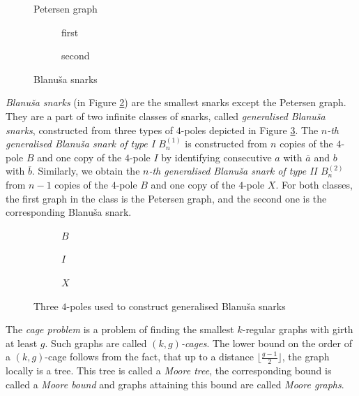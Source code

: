 \begin{minipage}{.3\textwidth}
\begin{figure}[H]
\centering

\caption{Petersen graph}
\label{fig:petersen}
\end{figure}
\end{minipage}%
%
\begin{minipage}{.7\textwidth}
\begin{figure}[H]
\centering
\begin{subfigure}{0.4\textwidth}
\centering

\caption{first}
\end{subfigure}
\begin{subfigure}{0.4\textwidth}
\centering

\caption{second}
\end{subfigure}
\caption{Blanuša snarks}
\label{fig:blanusa}
\end{figure}
\end{minipage}

\emph{Blanuša snarks} (in Figure \ref{fig:blanusa}) are the smallest snarks except the Petersen graph. They are a part of two infinite classes of snarks, called \emph{generalised Blanuša snarks}, constructed from three types of $4$-poles depicted in Figure \ref{fig:networks}. The \emph{$n$-th generalised Blanuša snark of type I $B_n^{(1)}$} is constructed from $n$ copies of the $4$-pole $B$ and one copy of the $4$-pole $I$ by identifying consecutive $a$ with $\overline{a}$ and $b$ with $\overline{b}$. Similarly, we obtain the \emph{$n$-th generalised Blanuša snark of type II $B_n^{(2)}$} from $n-1$ copies of the $4$-pole $B$ and one copy of the $4$-pole $X$. For both classes, the first graph in the class is the Petersen graph, and the second one is the corresponding Blanuša snark.

\begin{figure}[h!]
\centering
\begin{subfigure}{0.3\textwidth}
\centering

\caption{$B$}
\end{subfigure}
\begin{subfigure}{0.15\textwidth}
\centering

\caption{$I$}
\end{subfigure}
\begin{subfigure}{0.3\textwidth}
\centering

\caption{$X$}
\end{subfigure}
\caption{Three $4$-poles used to construct generalised Blanuša snarks}
\label{fig:networks}
\end{figure}

The \emph{cage problem} is a problem of finding the smallest $k$-regular graphs with girth at least $g$. Such graphs are called \emph{$(k,g)$-cages}. The lower bound on the order of a $(k, g)$-cage follows from the fact, that up to a distance $\lfloor\frac{g-1}{2}\rfloor$, the graph locally is a tree. This tree is called a \emph{Moore tree}, the corresponding bound is called a \emph{Moore bound} and graphs attaining this bound are called \emph{Moore graphs}.